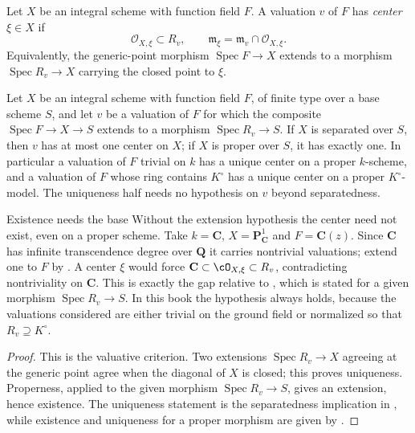 \begin{definition}\label{def:valuation-center}
Let $X$ be an integral scheme with function field $F$. A valuation $v$ of
$F$ has \emph{center} $\xi\in X$ if
\[
                  \mathcal O_{X,\xi}\subset R_v,
             \qquad \mathfrak m_\xi=\mathfrak m_v\cap\mathcal O_{X,\xi}.
\]
Equivalently, the generic-point morphism $\operatorname{Spec}F\to X$ extends
to a morphism $\operatorname{Spec}R_v\to X$ carrying the closed point to
$\xi$.
\end{definition}

\begin{proposition}\label{prop:centers-proper-separated}
Let $X$ be an integral scheme with function field $F$, of finite type over a
base scheme $S$, and let $v$ be a valuation of $F$ for which the composite
$\operatorname{Spec}F\to X\to S$ extends to a morphism
$\operatorname{Spec}R_v\to S$.  If $X$ is separated over $S$, then $v$ has at
most one center on $X$; if $X$ is proper over $S$, it has exactly one.  In
particular a valuation of $F$ trivial on $k$ has a unique center on a proper
$k$-scheme, and a valuation of $F$ whose ring contains $K^\circ$ has a unique
center on a proper $K^\circ$-model.  The uniqueness half needs no hypothesis
on $v$ beyond separatedness.
\end{proposition}

\begin{warning}{Existence needs the base}
Without the extension hypothesis the center need not exist, even on a proper
scheme.  Take $k=\mathbf C$, $X=\mathbf P^1_{\mathbf C}$ and
$F=\mathbf C(z)$.  Since $\mathbf C$ has infinite transcendence degree over
$\mathbf Q$ it carries nontrivial valuations; extend one to $F$ by
.  A center $\xi$ would force
$\mathbf C\subset\cO_{X,\xi}\subset R_v$, contradicting nontriviality on
$\mathbf C$.  This is exactly the gap relative to
\cite[Tag 0BX5]{stacks-project}, which is stated for a given morphism
$\operatorname{Spec}R_v\to S$.  In this book the hypothesis always holds,
because the valuations considered are either trivial on the ground field or
normalized so that $R_v\supseteq K^\circ$.
\end{warning}
\begin{proof}
This is the valuative criterion. Two extensions
$\operatorname{Spec}R_v\to X$ agreeing at the generic point agree when the
diagonal of $X$ is closed; this proves uniqueness. Properness, applied to the given morphism
$\operatorname{Spec}R_v\to S$, gives an extension, hence existence. The uniqueness statement is the separatedness
implication in \cite[Tag 01KZ]{stacks-project}, while existence and
uniqueness for a proper morphism are given by
\cite[Tag 0BX5]{stacks-project}.
\end{proof}

